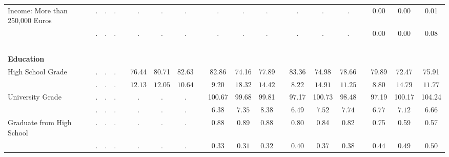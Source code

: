 \begin{center}
{\begin{longtable}{L{5cm} c c c p{.5cm} c c c p{.5cm} c c c p{.5cm} c c c p{.5cm} c c c}
 \quad Income: More than 250,000 Euros & . &         . &         . & &         . &         . &         . & &         . &         . &         . & &         . &         . &         . & &      0.00 &      0.00 &      0.01 \\*
 \quad & $\mathit{        .}$ & $\mathit{        .}$ & $\mathit{        .}$ & & $\mathit{        .}$ & $\mathit{        .}$ & $\mathit{        .}$ & & $\mathit{        .}$ & $\mathit{        .}$ & $\mathit{        .}$ & & $\mathit{        .}$ & $\mathit{        .}$ & $\mathit{        .}$ & & $\mathit{     0.00}$ & $\mathit{     0.00}$ & $\mathit{     0.08}$ \\[.2em]
 ~\\[-.5em]
\textbf{Education} \\[.6em]
 \quad High School Grade & . &         . &         . & &     76.44 &     80.71 &     82.63 & &     82.86 &     74.16 &     77.89 & &     83.36 &     74.98 &     78.66 & &     79.89 &     72.47 &     75.91 \\*
 \quad & $\mathit{        .}$ & $\mathit{        .}$ & $\mathit{        .}$ & & $\mathit{    12.13}$ & $\mathit{    12.05}$ & $\mathit{    10.64}$ & & $\mathit{     9.20}$ & $\mathit{    18.32}$ & $\mathit{    14.42}$ & & $\mathit{     8.22}$ & $\mathit{    14.91}$ & $\mathit{    11.25}$ & & $\mathit{     8.80}$ & $\mathit{    14.79}$ & $\mathit{    11.77}$ \\[.2em]
 \quad University Grade & . &         . &         . & &         . &         . &         . & &    100.67 &     99.68 &     99.81 & &     97.17 &    100.73 &     98.48 & &     97.19 &    100.17 &    104.24 \\*
 \quad & $\mathit{        .}$ & $\mathit{        .}$ & $\mathit{        .}$ & & $\mathit{        .}$ & $\mathit{        .}$ & $\mathit{        .}$ & & $\mathit{     6.38}$ & $\mathit{     7.35}$ & $\mathit{     8.38}$ & & $\mathit{     6.49}$ & $\mathit{     7.52}$ & $\mathit{     7.74}$ & & $\mathit{     6.77}$ & $\mathit{     7.12}$ & $\mathit{     6.66}$ \\[.2em]
 \quad Graduate from High School & . &         . &         . & &         . &         . &         . & &      0.88 &      0.89 &      0.88 & &      0.80 &      0.84 &      0.82 & &      0.75 &      0.59 &      0.57 \\*
 \quad & $\mathit{        .}$ & $\mathit{        .}$ & $\mathit{        .}$ & & $\mathit{        .}$ & $\mathit{        .}$ & $\mathit{        .}$ & & $\mathit{     0.33}$ & $\mathit{     0.31}$ & $\mathit{     0.32}$ & & $\mathit{     0.40}$ & $\mathit{     0.37}$ & $\mathit{     0.38}$ & & $\mathit{     0.44}$ & $\mathit{     0.49}$ & $\mathit{     0.50}$ \\[.2em]

\end{longtable}}
\end{center}
